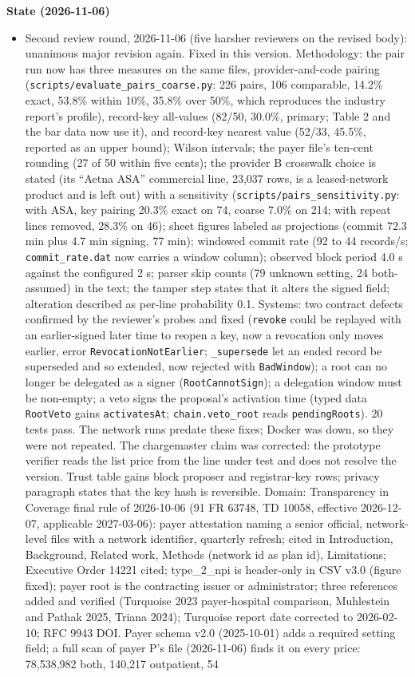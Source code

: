 \textbf{State (2026-11-06)}
\begin{itemize}
\item Second review round, 2026-11-06 (five harsher reviewers on the revised body): unanimous major revision again. Fixed in this version. Methodology: the pair run now has three measures on the same files, provider-and-code pairing (\texttt{scripts/evaluate\_pairs\_coarse.py}: 226 pairs, 106 comparable, 14.2\% exact, 53.8\% within 10\%, 35.8\% over 50\%, which reproduces the industry report's profile), record-key all-values (82/50, 30.0\%, primary; Table 2 and the bar data now use it), and record-key nearest value (52/33, 45.5\%, reported as an upper bound); Wilson intervals; the payer file's ten-cent rounding (27 of 50 within five cents); the provider B crosswalk choice is stated (its ``Aetna ASA'' commercial line, 23,037 rows, is a leased-network product and is left out) with a sensitivity (\texttt{scripts/pairs\_sensitivity.py}: with ASA, key pairing 20.3\% exact on 74, coarse 7.0\% on 214; with repeat lines removed, 28.3\% on 46); sheet figures labeled as projections (commit 72.3 min plus 4.7 min signing, 77 min); windowed commit rate (92 to 44 records/s; \texttt{commit\_rate.dat} now carries a window column); observed block period 4.0 s against the configured 2 s; parser skip counts (79 unknown setting, 24 both-assumed) in the text; the tamper step states that it alters the signed field; alteration described as per-line probability 0.1. Systems: two contract defects confirmed by the reviewer's probes and fixed (\texttt{revoke} could be replayed with an earlier-signed later time to reopen a key, now a revocation only moves earlier, error \texttt{RevocationNotEarlier}; \texttt{\_supersede} let an ended record be superseded and so extended, now rejected with \texttt{BadWindow}); a root can no longer be delegated as a signer (\texttt{RootCannotSign}); a delegation window must be non-empty; a veto signs the proposal's activation time (typed data \texttt{RootVeto} gains \texttt{activatesAt}; \texttt{chain.veto\_root} reads \texttt{pendingRoots}). 20 tests pass. The network runs predate these fixes; Docker was down, so they were not repeated. The chargemaster claim was corrected: the prototype verifier reads the list price from the line under test and does not resolve the version. Trust table gains block proposer and registrar-key rows; privacy paragraph states that the key hash is reversible. Domain: Transparency in Coverage final rule of 2026-10-06 (91 FR 63748, TD 10058, effective 2026-12-07, applicable 2027-03-06): payer attestation naming a senior official, network-level files with a network identifier, quarterly refresh; cited in Introduction, Background, Related work, Methods (network id as plan id), Limitations; Executive Order 14221 cited; type\_2\_npi is header-only in CSV v3.0 (figure fixed); payer root is the contracting issuer or administrator; three references added and verified (Turquoise 2023 payer-hospital comparison, Muhlestein and Pathak 2025, Triana 2024); Turquoise report date corrected to 2026-02-10; RFC 9943 DOI. Payer schema v2.0 (2025-10-01) adds a required setting field; a full scan of payer P's file (2026-11-06) finds it on every price: 78,538,982 both, 140,217 outpatient, 54 
\end{itemize}
